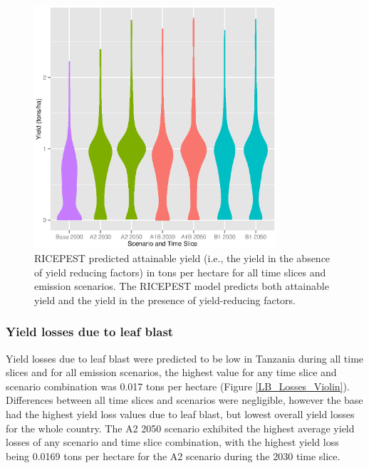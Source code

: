 \documentclass[preprint,12pt]{elsarticle}
\begin{document}
\begin{figure}[H]
  \includegraphics[width = 90mm]{figures/Yield_Attainable_Violin}
  \caption{RICEPEST predicted attainable yield (i.e., the yield in the absence of yield reducing factors) in tons per hectare for all time slices and emission scenarios. The RICEPEST model predicts both attainable yield and the yield in the presence of yield-reducing factors.}
  \label{Yield_Attainable_Violin}
\end{figure}

\subsubsection{Yield losses due to leaf blast}
Yield losses due to leaf blast were predicted to be low in Tanzania during all time slices and for all emission scenarios, the highest value for any time slice and scenario combination was 0.017 tons per hectare (Figure \ref{LB_Losses_Violin}). Differences between all time slices and scenarios were negligible, however the base had the highest yield loss values due to leaf blast, but lowest overall yield losses for the whole country. The A2 2050 scenario exhibited the highest average yield losses of any scenario and time slice combination, with the highest yield loss being 0.0169 tons per hectare for the A2 scenario during the 2030 time slice.
\end{document}
